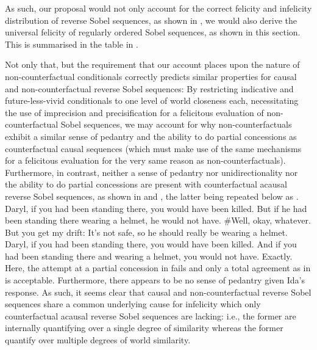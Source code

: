 As such, our proposal would not only account for the correct felicity and infelicity distribution of reverse Sobel sequences, as shown in , we would also derive the universal felicity of regularly ordered Sobel sequences, as shown in this section. This is summarised in the table in .
\begin{table}[!htb]
\end{table}
Not only that, but the requirement that our account places upon the nature of non-counterfactual conditionals correctly predicts similar properties for causal and non-counterfactual reverse Sobel sequences: By restricting indicative and future-less-vivid conditionals to one level of world closeness each, necessitating the use of imprecision and precisification for a felicitous evaluation of non-counterfactual Sobel sequences, we may account for why non-counterfactuals exhibit a similar sense of pedantry and the ability to do partial concessions as counterfactual causal sequences (which must make use of the same mechanisms for a felicitous evaluation for the very same reason as non-counterfactuals). Furthermore, in contrast, neither a sense of pedantry nor unidirectionality nor the ability to do partial concessions are present with counterfactual acausal reverse Sobel sequences, as shown in  and , the latter being repeated below as .
\pex{}
			\a	{}Daryl, if you had been standing there, you would have been killed.
			\a	{}But if he had been standing there wearing a helmet, he would not have.
			\a	{}\#Well, okay, whatever. But you get my drift: It's not safe, so he should really be wearing a helmet.\hfill\parencite[adapted from][p.~139]{Klecha2015}
\xe
\pex{}
			\a	{}Daryl, if you had been standing there, you would have been killed.
			\a	{}And if you had been standing there and wearing a helmet, you would not have.
			\a	{}Exactly.\hfill\parencite[p.~150]{Klecha2015}
\xe
Here, the attempt at a partial concession in  fails and only a total agreement as in  is acceptable. Furthermore, there appears to be no sense of pedantry given Ida's response. As such, it seems clear that causal and non-counterfactual reverse Sobel sequences share a common underlying cause for infelicity which only counterfactual acausal reverse Sobel sequences are lacking: i.e., the former are internally quantifying over a single degree of similarity whereas the former quantify over multiple degrees of world similarity.

